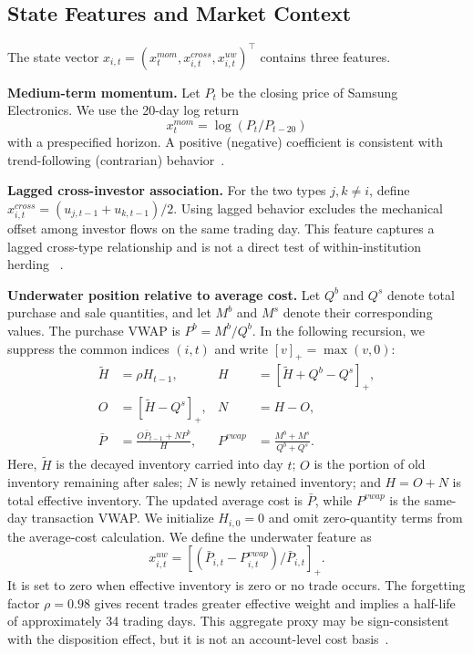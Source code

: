 \subsection{State Features and Market Context}
\label{sec:features}

The state vector
$x_{i,t}=(x^{mom}_{t},x^{cross}_{i,t},x^{uw}_{i,t})^\top$ contains three features.

\textbf{Medium-term momentum.}
Let $P_t$ be the closing price of Samsung Electronics. We use the 20-day log return
\[
x^{mom}_{t}=\log(P_t/P_{t-20})
\]
with a prespecified horizon. A positive (negative) coefficient is consistent with
trend-following (contrarian) behavior~\cite{grinblatt2000investment,choe1999foreign}.

\textbf{Lagged cross-investor association.}
For the two types $j,k\ne i$, define
$x^{cross}_{i,t}=(u_{j,t-1}+u_{k,t-1})/2$. Using lagged behavior excludes the mechanical
offset among investor flows on the same trading day. This feature captures a lagged
cross-type relationship and is not a direct test of within-institution herding
~\cite{lakonishok1992impact}.

\textbf{Underwater position relative to average cost.}
Let $Q^b$ and $Q^s$ denote total purchase and sale quantities, and let $M^b$ and $M^s$
denote their corresponding values. The purchase VWAP is $P^b=M^b/Q^b$. In the following
recursion, we suppress the common indices $(i,t)$ and write $[v]_+=\max(v,0)$:
\begin{equation}
\begin{aligned}
\widetilde H&=\rho H_{t-1}, & H&=[\widetilde H+Q^b-Q^s]_+,\\
O&=[\widetilde H-Q^s]_+, & N&=H-O,\\
\bar P&=\frac{O\bar P_{t-1}+NP^b}{H},&
P^{vwap}&=\frac{M^b+M^s}{Q^b+Q^s}.
\end{aligned}
\label{eq:cost}
\end{equation}
Here, $\widetilde H$ is the decayed inventory carried into day $t$; $O$ is the portion of
old inventory remaining after sales; $N$ is newly retained inventory; and $H=O+N$ is total
effective inventory. The updated average cost is $\bar P$, while $P^{vwap}$ is the
same-day transaction VWAP. We initialize $H_{i,0}=0$ and omit zero-quantity terms from the
average-cost calculation. We define the underwater feature as
\[
x^{uw}_{i,t}=\left[(\bar P_{i,t}-P^{vwap}_{i,t})/\bar P_{i,t}\right]_+ .
\]
It is set to zero when effective inventory is zero or no trade occurs. The forgetting
factor $\rho=0.98$ gives
recent trades greater effective weight and implies a half-life of approximately 34 trading
days. This aggregate proxy may be sign-consistent with the disposition effect, but it is
not an account-level cost basis~\cite{shefrin1985disposition,odean1998investors}.

